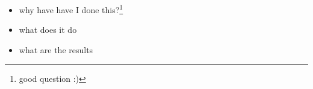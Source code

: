 \noindent

\begin{itemize}
    \item why have have I done this?\footnote{good question :)}
    \item what does it do
    \item what are the results
\end{itemize}


